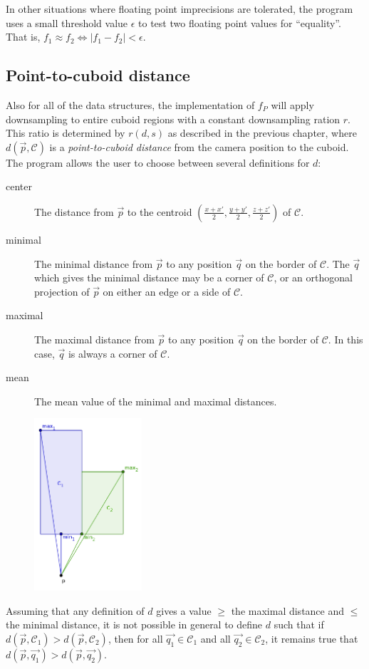 \documentclass[a4paper,10pt,abstracton,notitlepage]{scrreprt}
\begin{document}
In other situations where floating point imprecisions are tolerated, the program uses a small threshold value $\epsilon$ to test two floating point values for ``equality''. That is, $f_{1} \approx f_{2} \Longleftrightarrow |f_{1} - f_{2}| < \epsilon$.

\subsection{Point-to-cuboid distance}
Also for all of the data structures, the implementation of $f_{P}$ will apply downsampling to entire cuboid regions with a constant downsampling ration $r$. This ratio is determined by $r(d, s)$ as described in the previous chapter, where $d(\overrightarrow{p}, \mathcal{C})$ is a \emph{point-to-cuboid distance} from the camera position to the cuboid. The program allows the user to choose between several definitions for $d$:
\begin{description}
\item[center] The distance from $\overrightarrow{p}$ to the centroid $( \frac{x + x'}{2}, \frac{y + y'}{2}, \frac{z + z'}{2} )$ of $\mathcal{C}$.
\item[minimal] The minimal distance from $\overrightarrow{p}$ to any position $\overrightarrow{q}$ on the border of $\mathcal{C}$. The $\overrightarrow{q}$ which gives the minimal distance may be a corner of $\mathcal{C}$, or an orthogonal projection of $\overrightarrow{p}$ on either an edge or a side of $\mathcal{C}$.
\item[maximal] The maximal distance from $\overrightarrow{p}$ to any position $\overrightarrow{q}$ on the border of $\mathcal{C}$. In this case, $\overrightarrow{q}$ is always a corner of $\mathcal{C}$.
\item[mean] The mean value of the minimal and maximal distances.
\end{description}

\begin{figure}
\includegraphics[width=4cm]{minMaxDistance.png}
\label{fig:min_max_c_d}
\end{figure}
Assuming that any definition of $d$ gives a value $\geq$ the maximal distance and $\leq$ the minimal distance, it is not possible in general to define $d$ such that if $d(\overrightarrow{p}, \mathcal{C_{1}}) > d(\overrightarrow{p}, \mathcal{C_{2}})$, then for all $\overrightarrow{q_{1}} \in \mathcal{C_{1}}$ and all $\overrightarrow{q_{2}} \in \mathcal{C_{2}}$, it remains true that $d(\overrightarrow{p}, \overrightarrow{q_{1}}) > d(\overrightarrow{p}, \overrightarrow{q_{2}})$. 
\end{document}
